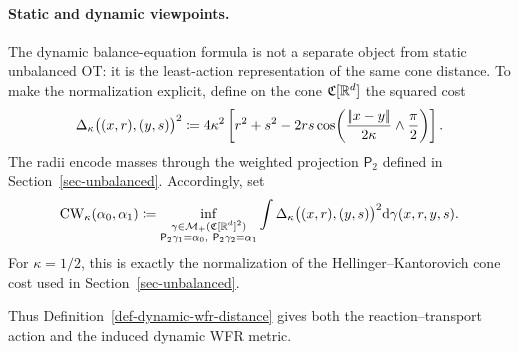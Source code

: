 \paragraph{Static and dynamic viewpoints.}
The dynamic balance-equation formula is not a separate object from static unbalanced OT: it is the least-action representation of the same cone distance. To make the normalization explicit, define on the cone $\mathfrak C[\mathbb{R}^d]$ the squared cost
\begin{equation}\label{eq-wfr-scaled-cone-metric}
\Delta_\kappa\big((x,r),(y,s)\big)^2
\coloneqq
4\kappa^2
\left[
r^2+s^2-2rs
\cos\!\left(
\frac{|\!| x-y |\!|}{2\kappa}\wedge\frac{\pi}{2}
\right)
\right].
\end{equation}
The radii encode masses through the weighted projection $\mathsf P_2$ defined in Section~\ref{sec-unbalanced}. Accordingly, set
\begin{equation}\label{eq-wfr-scaled-cone-value}
\operatorname{CW}_\kappa(\alpha_0,\alpha_1)
\coloneqq
\inf_{\substack{\gamma\in\mathcal{M}_+(\mathfrak C[\mathbb{R}^d]^2)\\
\mathsf P_2\gamma_1=\alpha_0,\ \mathsf P_2\gamma_2=\alpha_1}}
\int
\Delta_\kappa\big((x,r),(y,s)\big)^2
\mathrm{d}\gamma(x,r,y,s).
\end{equation}
For $\kappa=1/2$, this is exactly the normalization of the Hellinger--Kantorovich cone cost used in Section~\ref{sec-unbalanced}.

Thus Definition~\ref{def-dynamic-wfr-distance} gives both the reaction--transport action and the induced dynamic WFR metric.

